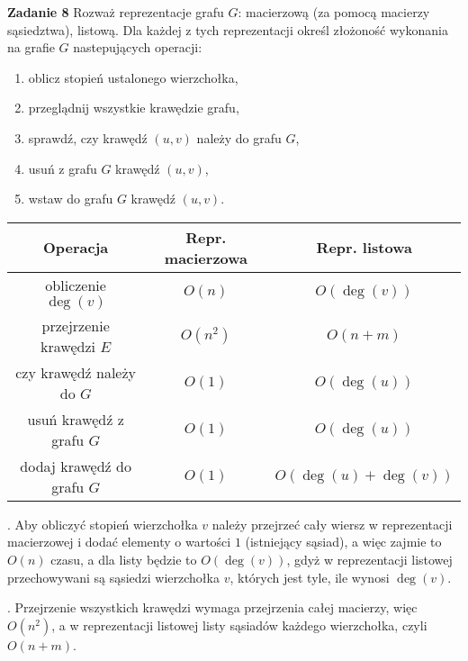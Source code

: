 \documentclass[a4paper,12pt]{article}
\begin{document}
\newpage
\noindent \textbf{Zadanie 8} \newline
Rozważ reprezentacje grafu $G$: macierzową (za pomocą macierzy sąsiedztwa), 
listową. Dla każdej z tych reprezentacji określ złożoność wykonania na grafie
$G$ nastepujących operacji:
\begin{enumerate}
    \item oblicz stopień ustalonego wierzchołka,
    \item przeglądnij wszystkie krawędzie grafu,
    \item sprawdź, czy krawędź $(u, v)$ należy do grafu $G$,
    \item usuń z grafu $G$ krawędź $(u, v)$,
    \item wstaw do grafu $G$ krawędź $(u, v)$.
\end{enumerate}

\begin{table}[h]
\centering
\begin{adjustbox}{width=1\textwidth}
\tiny
\begin{tabular}{|c|c|c|}
    \hline
    Operacja                   & Repr. macierzowa & Repr. listowa           \\ \hline
    obliczenie $\deg(v)$       &  $O(n)$          & $O(\deg(v))$            \\ \hline
    przejrzenie krawędzi $E$   &  $O(n^2)$        & $O(n+m)$                \\ \hline
    czy krawędź należy do $G$  &  $O(1)$          & $O(\deg(u))$            \\ \hline
    usuń krawędź z grafu $G$   &  $O(1)$          & $O(\deg(u))$            \\ \hline
    dodaj krawędź do grafu $G$ &  $O(1)$          & $O(\deg(u) + \deg(v))$  \\ \hline
\end{tabular}
\end{adjustbox}
\end{table}

\noindent {}. Aby obliczyć stopień wierzchołka $v$ należy przejrzeć cały 
wiersz w reprezentacji macierzowej i dodać elementy o wartości $1$ (istniejący sąsiad),
a więc zajmie to $O(n)$ czasu, a dla listy będzie to $O(\deg(v))$, gdyż w reprezentacji
listowej przechowywani są sąsiedzi wierzchołka $v$, których jest tyle, ile wynosi $\deg(v)$.

\noindent {}. Przejrzenie wszystkich krawędzi wymaga przejrzenia całej macierzy, 
więc $O(n^2)$, a w reprezentacji listowej listy sąsiadów każdego wierzchołka, czyli $O(n+m)$.
\end{document}

